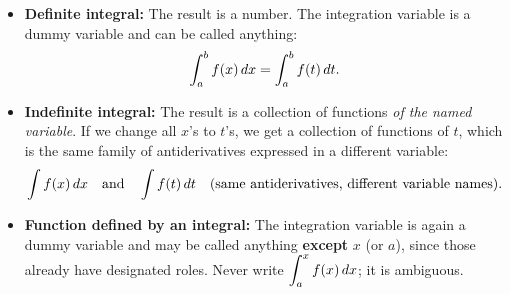 \begin{itemize}
  \item \textbf{Definite integral:} The result is a number.  The integration variable is a dummy variable and can be called anything:
  \[
    \int_{a}^{b} f(x)\,dx = \int_{a}^{b} f(t)\,dt.
  \]
  \item \textbf{Indefinite integral:} The result is a collection of functions \textit{of the named variable}.  If we change all $x$'s to $t$'s, we get a collection of functions of $t$, which is the same family of antiderivatives expressed in a different variable:
  \[
    \int f(x)\,dx \quad\text{and}\quad \int f(t)\,dt \quad \text{(same antiderivatives, different variable names)}.
  \]
  \item \textbf{Function defined by an integral:} The integration variable is again a dummy variable and may be called anything \textbf{except} $x$ (or $a$), since those already have designated roles.  Never write $\displaystyle\int_{a}^{x} f(x)\,dx$; it is ambiguous.
\end{itemize}
